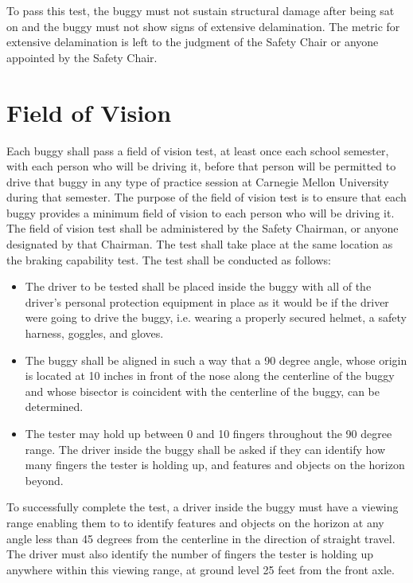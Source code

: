 	To pass this test, the buggy must not sustain structural damage after being sat on and the buggy must not show signs of extensive delamination. The metric for extensive delamination is left to the judgment of the Safety Chair or anyone appointed by the Safety Chair.

\section{Field of Vision}

	Each buggy shall pass a field of vision test, at least once each school semester, with each person who will be driving it, before that person will be permitted to drive that buggy in any type of practice session at Carnegie Mellon University during that semester. The purpose of the field of vision test is to ensure that each buggy provides a minimum field of vision to each person who will be driving it. The field of vision test shall be administered by the Safety Chairman, or anyone designated by that Chairman. The test shall take place at the same location as the braking capability test.
	The test shall be conducted as follows:

	\begin{itemize}

		\item
		The driver to be tested shall be placed inside the buggy with all of the driver's personal protection equipment in place as it would be if the driver were going to drive the buggy, i.e. wearing a properly secured helmet, a safety harness, goggles, and gloves.

		\item
		The buggy shall be aligned in such a way that a 90 degree angle, whose origin is located at 10 inches in front of the nose along the centerline of the buggy and whose bisector is coincident with the centerline of the buggy, can be determined.

		\item
		The tester may hold up between 0 and 10 fingers throughout the 90 degree range. The driver inside the buggy shall be asked if they can identify how many fingers the tester is holding up, and features and objects on the horizon beyond.

	\end{itemize}

	To successfully complete the test, a driver inside the buggy must have a viewing range enabling them to to identify features and objects on the horizon at any angle less than 45 degrees from the centerline in the direction of straight travel. The driver must also identify the number of fingers the tester is holding up anywhere within this viewing range, at ground level 25 feet from the front axle.

